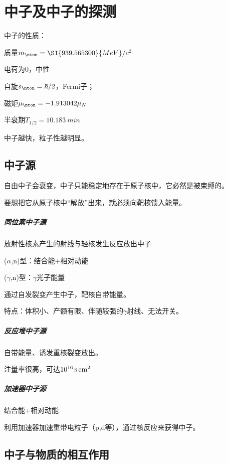 \chapter{中子及中子的探测}
中子的性质：
\begin{compactitem}
	\item 质量$m_\nton=\SI{939.565300}{MeV}/c^2$
	\item 电荷为0，中性
	\item 自旋$s_\nton=\hbar/2$，Fermi子； 
	\item 磁矩$\mu_\nton=-1.913042\mu_N$
	\item 半衰期$T_{1/2}=\SI{10.183}{min}$
\end{compactitem}
中子越快，粒子性越明显。

\section{中子源}

自由中子会衰变，中子只能稳定地存在于原子核中，它必然是被束缚的。

要想把它从原子核中“解放”出来，就必须向靶核馈入能量。
\paragraph{同位素中子源}放射性核素产生的射线与轻核发生反应放出中子
\begin{compactitem}
	\item ($\alpha$,n)型：结合能+相对动能
	\item ($\gamma$,n)型：$\gamma$光子能量 
\end{compactitem}
通过自发裂变产生中子，靶核自带能量。

特点：体积小、产额有限、伴随较强的$\gamma$射线、无法开关。
\paragraph{反应堆中子源}自带能量、诱发重核裂变放出。

注量率很高，可达$\SI{E16}{/s.cm^2}$
\paragraph{加速器中子源}结合能+相对动能

利用加速器加速重带电粒子（p,d等），通过核反应来获得中子。

\section{中子与物质的相互作用}

